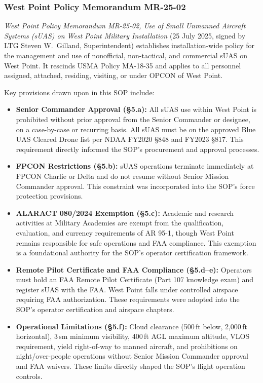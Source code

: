         \subsubsection{West Point Policy Memorandum MR-25-02}
        \textit{West Point Policy Memorandum MR-25-02, Use of Small Unmanned Aircraft Systems (sUAS) on West Point Military Installation} (25 July 2025, signed by LTG Steven W.\ Gilland, Superintendent) establishes installation-wide policy for the management and use of nonofficial, non-tactical, and commercial sUAS on West Point.  It rescinds USMA Policy MA-18-35 and applies to all personnel assigned, attached, residing, visiting, or under OPCON of West Point.

        Key provisions drawn upon in this SOP include:
        \begin{itemize}
            \item \textbf{Senior Commander Approval ({\S}5.a):} All sUAS use within West Point is prohibited without prior approval from the Senior Commander or designee, on a case-by-case or recurring basis.  All sUAS must be on the approved Blue UAS Cleared Drone list per NDAA FY2020 {\S}848 and FY2023 {\S}817.  This requirement directly informed the SOP's procurement and approval processes.
            \item \textbf{FPCON Restrictions ({\S}5.b):} sUAS operations terminate immediately at FPCON Charlie or Delta and do not resume without Senior Mission Commander approval.  This constraint was incorporated into the SOP's force protection provisions.
            \item \textbf{ALARACT 080/2024 Exemption ({\S}5.c):} Academic and research activities at Military Academies are exempt from the qualification, evaluation, and currency requirements of AR 95-1, though West Point remains responsible for safe operations and FAA compliance.  This exemption is a foundational authority for the SOP's operator certification framework.
            \item \textbf{Remote Pilot Certificate and FAA Compliance ({\S}5.d--e):} Operators must hold an FAA Remote Pilot Certificate (Part 107 knowledge exam) and register sUAS with the FAA.  West Point falls under controlled airspace requiring FAA authorization.  These requirements were adopted into the SOP's operator certification and airspace chapters.
            \item \textbf{Operational Limitations ({\S}5.f):} Cloud clearance (500\,ft below, 2,000\,ft horizontal), 3\,sm minimum visibility, 400\,ft AGL maximum altitude, VLOS requirement, yield right-of-way to manned aircraft, and prohibitions on night/over-people operations without Senior Mission Commander approval and FAA waivers.  These limits directly shaped the SOP's flight operation controls.

\end{itemize}
